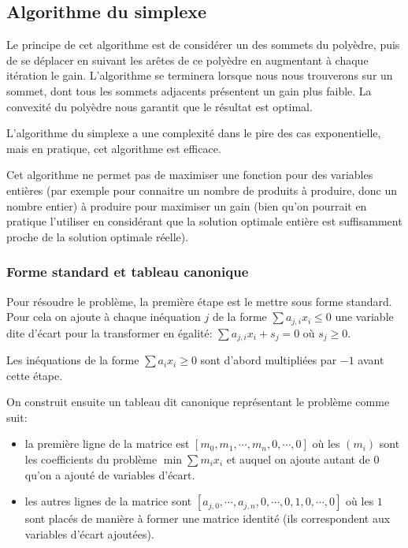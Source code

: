 \documentclass{scrartcl}
\begin{document}
  \subsection{Algorithme du simplexe}
    Le principe de cet algorithme est de considérer un des sommets du polyèdre,
    puis de se déplacer en suivant les arêtes de ce polyèdre en augmentant à
    chaque itération le gain. L'algorithme se terminera lorsque nous nous 
    trouverons sur un sommet, dont tous les sommets adjacents présentent un gain
    plus faible. La convexité du polyèdre nous garantit que le résultat est 
    optimal.

    L'algorithme du simplexe a une complexité dans le pire des cas
    exponentielle, mais en pratique, cet algorithme est efficace.
    
    Cet algorithme ne permet pas de maximiser une fonction pour des variables
    entières (par exemple pour connaitre un nombre de produits à produire, donc
    un nombre entier) à produire pour maximiser un gain (bien qu'on pourrait en
    pratique l'utiliser en considérant que la solution optimale entière est
    suffisamment proche de la solution optimale réelle).

    \subsubsection{Forme standard et tableau canonique}
      Pour résoudre le problème, la première étape est le mettre sous forme
      standard. Pour cela on ajoute à chaque inéquation $j$ de la forme
      $\sum a_{j,i}x_i \leq 0$ une variable dite d'écart pour la transformer en
      égalité: $\sum a_{j,i}x_i + s_j = 0$ où $s_j \geq 0$.
      
      Les inéquations de la forme $\sum a_ix_i \geq 0$ sont d'abord multipliées
      par $-1$ avant cette étape.

      On construit ensuite un tableau dit canonique représentant le problème
      comme suit:
      \begin{itemize}
        \item la première ligne de la matrice est
          $[m_0, m_1, \cdots, m_n, 0, \cdots, 0]$ où les $(m_i)$ sont les
          coefficients du problème $\min \sum m_ix_i$ et auquel on ajoute
          autant de $0$ qu'on a ajouté de variables d'écart.
        \item les autres lignes de la matrice sont
          $[a_{j,0}, \cdots, a_{j,n}, 0, \cdots, 0, 1,0, \cdots, 0]$ où les $1$
          sont placés de manière à former une matrice identité (ils
          correspondent aux variables d'écart ajoutées).
      \end{itemize}
\end{document}
